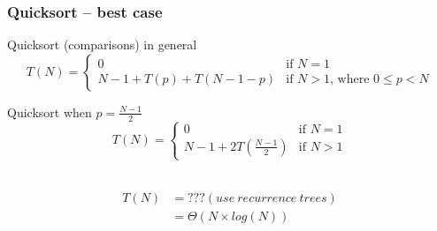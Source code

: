\documentclass[aspectratio=169]{beamer}
\begin{document}
\begin{frame}\frametitle{Quicksort -- best case}

  \begin{block}{Quicksort (comparisons) in general}
  $$T(N) = \left\{
    \begin{array}{ll}
      0 & \text{if }N=1
      \\
      N-1 + T(p) + T(N-1-p) & \text{if }N>1\text{, where }0\leq p < N
    \end{array}
  \right.$$
  \end{block}

  \begin{exampleblock}{Quicksort when $p=\frac{N-1}{2}$}
  $$T(N) = \left\{
    \begin{array}{ll}
      0 & \text{if }N=1
      \\
      N-1 + 2T(\frac{N-1}{2}) & \text{if }N>1
    \end{array}
  \right.$$
  \end{exampleblock}

  \pause~\\[-8mm]
  \begin{align*}
    T(N) &= {??? (use~recurrence~trees)}
       \\&= \Theta(N \times log(N))
  \end{align*}
\end{frame}



\end{document}
